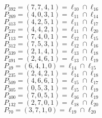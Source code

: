 \documentclass{article}
\begin{document}
{\begin{multicols}{2}
$P_{392} = ( 7, 7, 4, 1 ) = \ell_{10} \cap \ell_{16} $\\
$P_{269} = ( 4, 0, 3, 1 ) = \ell_{11} \cap \ell_{14} $\\
$P_{413} = ( 4, 2, 5, 1 ) = \ell_{11} \cap \ell_{17} $\\
$P_{237} = ( 4, 4, 2, 1 ) = \ell_{11} \cap \ell_{20} $\\
$P_{113} = ( 7, 4, 0, 1 ) = \ell_{12} \cap \ell_{15} $\\
$P_{312} = ( 7, 5, 3, 1 ) = \ell_{12} \cap \ell_{16} $\\
$P_{339} = ( 2, 1, 4, 1 ) = \ell_{13} \cap \ell_{18} $\\
$P_{491} = ( 2, 4, 6, 1 ) = \ell_{13} \cap \ell_{19} $\\
$P_{49} = ( 6, 4, 1, 0 ) = \ell_{14} \cap \ell_{15} $\\
$P_{235} = ( 2, 4, 2, 1 ) = \ell_{14} \cap \ell_{18} $\\
$P_{509} = ( 4, 6, 6, 1 ) = \ell_{15} \cap \ell_{17} $\\
$P_{305} = ( 0, 5, 3, 1 ) = \ell_{15} \cap \ell_{19} $\\
$P_{400} = ( 7, 0, 5, 1 ) = \ell_{16} \cap \ell_{19} $\\
$P_{132} = ( 2, 7, 0, 1 ) = \ell_{18} \cap \ell_{20} $\\
$P_{70} = ( 3, 7, 1, 0 ) = \ell_{19} \cap \ell_{20} $\\
\end{multicols}
}
\end{document}
